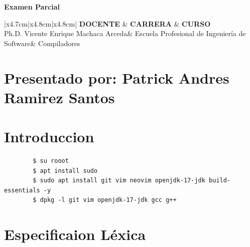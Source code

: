 \documentclass{article}
\newenvironment{code}{\captionsetup{type=listing}}{}
\newcommand{\csdocente}{Ph.D. Vicente Enrique Machaca Arceda}
\newcommand{\cscurso}{Compiladores}
\newcommand{\csescuela}{Escuela Profesional de Ingeniería de Software}
\begin{document}
	\vspace*{10px}
	
	\begin{center}	
		\fontsize{17}{17} \textbf{ Examen Parcial	}
	\end{center}
	

\renewcommand{\arraystretch}{1.5}
\begin{table}[h]
	\begin{tabular}{|x{4.7cm}|x{4.8cm}|x{4.8cm}|}
		\hline 
		\textbf{DOCENTE} & \textbf{CARRERA}  & \textbf{CURSO}   \\
		\hline 
		\csdocente & \csescuela & \cscurso    \\
		\hline 
	\end{tabular}
\end{table}	

\renewcommand{\arraystretch}{1} 
	\section*{Presentado por: Patrick Andres Ramirez Santos}
 
	\tableofcontents


	

\newpage

\section{Introduccion}

        \begin{verbatim}
        $ su rooot
        $ apt install sudo
        $ sudo apt install git vim neovim openjdk-17-jdk build-essentials -y
        $ dpkg -l git vim openjdk-17-jdk gcc g++
        \end{verbatim}

\section[short]{Especificaion Léxica}

\end{document}
